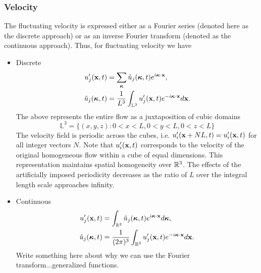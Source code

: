 \documentclass[oneside,a4paper,11pt]{report}
\newcommand{\ufluc}{u'}
\newcommand{\kappavec}{\boldsymbol{\kappa}}
\begin{document}
\subsubsection{Velocity}
The fluctuating velocity is expressed either as a Fourier series (denoted here as the discrete approach) or as an inverse Fourier transform (denoted as the continuous approach). Thus, for fluctuating velocity we have 
\begin{itemize}
\item Discrete
\begin{align}
\ufluc_j(\xvec,t) &= \sum_{\kappavec} \hat{u}_j(\kappavec,t) e^{i \kappavec \cdot \xvec}, \\
\hat{u}_j(\kappavec,t) &= \frac{1}{L^3} \int_{\mathbb{L}^3} \ufluc_j(\xvec,t) e^{-i \kappavec \cdot \xvec} d\xvec.
\end{align}
The above represents the entire flow as a juxtaposition of cubic domains 
\begin{equation}
\mathbb{L}^3 = \{ (x,y,z): 0< x < L, 0 < y < L, 0< z< L \}
\end{equation}
The velocity field is periodic across the cubes, i.e. $\ufluc_i(\xvec + NL,t) = \ufluc_i(\xvec,t)$ for all integer vectors $N$. Note that $\ufluc_i(\xvec,t)$ corresponds to the velocity of the original homogeneous flow within a cube of equal dimensions. This representation maintains spatial homogeneity over ${\mathbb{R}^3}$. The effects of the artificially imposed periodicity decreases as the ratio of $L$ over the integral length scale approaches infinity.
\item Continuous
\begin{align}
\ufluc_j(\xvec,t) &= \int_\Rthree \hat{u}_j(\kappavec,t) e^{i\kappavec \cdot \xvec} d\kappavec, \\
\hat{u}_j(\kappavec,t) &= \frac{1}{(2\pi)^3} \int_\Rthree \ufluc_j(\xvec,t) e^{-i \kappavec \cdot \xvec} d\xvec.
\end{align}
Write something here about why we can use the Fourier transform...generalized functions.
\end{itemize}
\end{document}
